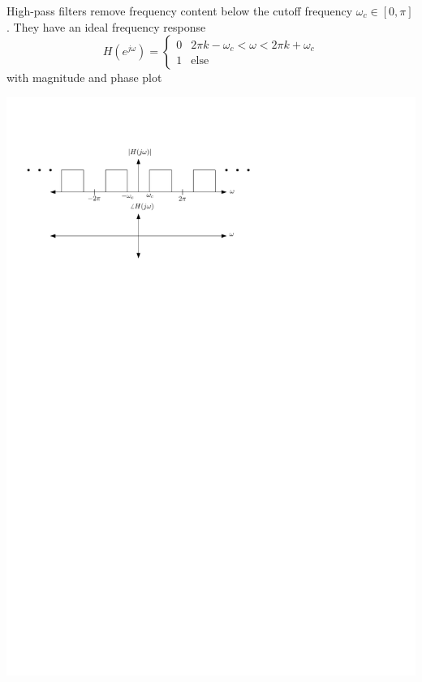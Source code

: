 High-pass filters remove frequency content below the cutoff frequency $\omega_c\in [0,\pi]$. They have an ideal frequency response
\[
H\left(e^{j\omega}\right) = \left\{ \begin{array}{lc}
  0 & 2\pi k -\omega_c < \omega < 2\pi k + \omega_c\\
  1 & \text{else}
\end{array}
\right. 
\]
with magnitude and phase plot
\begin{center}
  \includegraphics[scale=1]{graphics/highpass-ideal-dt.pdf}
\end{center}

